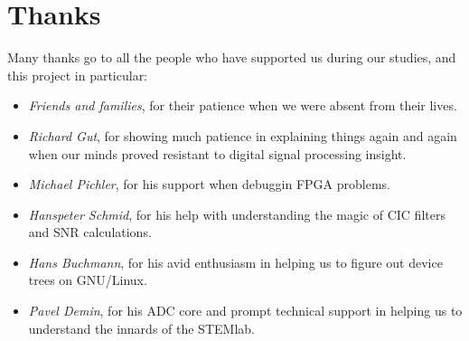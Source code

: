 %
%
\chapter*{Thanks} %
\label{ch:app:thanks}
\vspace{16em}

Many thanks go  to all the people  who have supported us  during our studies,
and this project in particular:

\begin{itemize}
    \item[]\emph{Friends and families}, for their patience when we were absent
        from their lives.
    \item[]\emph{Richard Gut}, for showing  much patience in explaining things
        again  and again  when our  minds proved  resistant to  digital signal
        processing insight.
    \item[]\emph{Michael Pichler}, for his support when debuggin FPGA problems.
    \item[]\emph{Hanspeter Schmid}, for his help with understanding the magic
        of CIC filters and SNR calculations.
    \item[]\emph{Hans Buchmann},  for his  avid enthusiasm  in helping  us to
        figure out device trees on GNU/Linux.
    \item[]\emph{Pavel Demin}, for his ADC core and prompt technical support
        in helping us to understand the innards of the STEMlab.
\end{itemize}


